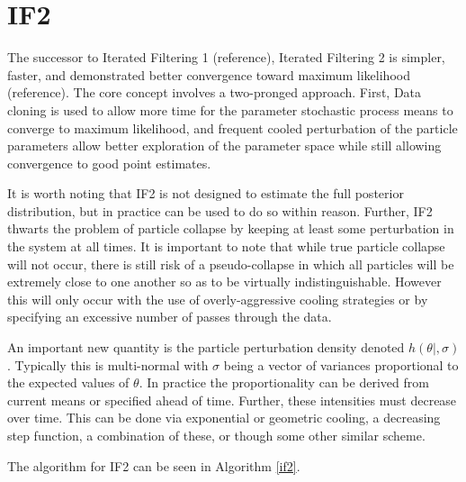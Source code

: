 \documentclass[12pt]{article}
\begin{document}
\section{IF2}

	The successor to Iterated Filtering 1 (reference), Iterated Filtering 2 is simpler, faster, and demonstrated better convergence toward maximum likelihood (reference). The core concept involves a two-pronged approach. First, Data cloning is used to allow more time for the parameter stochastic process means to converge to maximum likelihood, and frequent cooled perturbation of the particle parameters allow better exploration of the parameter space while still allowing convergence to good point estimates.

	It is worth noting that IF2 is not designed to estimate the full posterior distribution, but in practice can be used to do so within reason. Further, IF2 thwarts the problem of particle collapse by keeping at least some perturbation in the system at all times. It is important to note that while true particle collapse will not occur, there is still risk of a pseudo-collapse in which all particles will be extremely close to one another so as to be virtually indistinguishable. However this will only occur with the use of overly-aggressive cooling strategies or by specifying an excessive number of passes through the data.

	An important new quantity is the particle perturbation density denoted $h(\theta|,\sigma)$. Typically this is multi-normal with $\sigma$ being a vector of variances proportional to the expected values of $\theta$. In practice the proportionality can be derived from current means or specified ahead of time. Further, these intensities must decrease over time. This can be done via exponential or geometric cooling, a decreasing step function, a combination of these, or though some other similar scheme.

	The algorithm for IF2 can be seen in Algorithm \ref{if2}.\\
\end{document}
